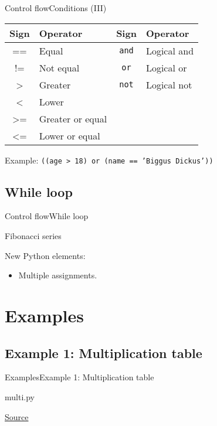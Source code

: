 \documentclass[10pt,compress]{beamer} %
\begin{document}
\begin{frame}[fragile]{Control flow}{Conditions (III)}
	\centering \begin{tabular}{cl|cl}\hline
	\sc Sign & \sc Operator & \sc Sign 	& \sc Operator \\ \hline
	== 	 & Equal   		& \texttt{and} 	& Logical and \\
	!= 	& Not equal  	& \texttt{or}	& Logical or  \\
	> 	& Greater 		& \texttt{not}	& Logical not \\
	< 	& Lower			&   	& \\
	>= 	& Greater or equal 		& 	& \\
	<= 	& Lower or equal 		& 	& \\\hline
	\end{tabular}

	\bigskip

	Example: \texttt{((age > 18) or (name == 'Biggus Dickus'))}
\end{frame}

\subsection{While loop}
\begin{frame}{Control flow}{While loop}
	\begin{block}{Fibonacci series}
	\vspace{-0.2cm}
		
	\end{block}

    New Python elements:
	\begin{itemize}
	\item Multiple assignments.
	\end{itemize}
	
\end{frame}

\section{Examples}
\subsection{Example 1: Multiplication table}
\begin{frame}{Examples}{Example 1: Multiplication table}
	\begin{block}{multi.py}
		
	\end{block}
		\tiny{\href{http://www.pythonforbeginners.com/basics/using-math-in-python/}{Source}}
\end{frame}
\end{document}
